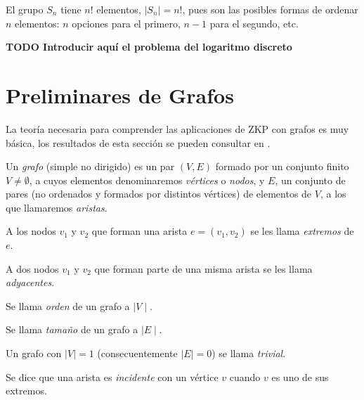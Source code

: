 \begin{remark}
	El grupo $S_n$ tiene $n!$ elementos, $\mid S_n \mid = n!$, pues son las posibles formas de ordenar $n$ elementos: $n$ opciones para el primero, $n-1$ para el segundo, etc.
\end{remark}




\textbf{TODO Introducir aquí el problema del logaritmo discreto}
%
%
%
%
%
%






\hfil

\section{Preliminares de Grafos}

La teoría necesaria para comprender las aplicaciones de ZKP con grafos es muy básica, los resultados de esta sección se pueden consultar en \citep{grafosyOD}.

\begin{definition}
	Un \textit{grafo} (simple no dirigido) es un par $(V,E)$ formado por un conjunto finito $V \neq \emptyset$, a cuyos elementos denominaremos \textit{vértices} o \textit{nodos}, y $E$, un conjunto de pares (no ordenados y formados por distintos vértices) de elementos de $V$, a los que llamaremos \textit{aristas}.
	
	A los nodos $v_1$ y $v_2$ que forman una arista $e = (v_1, v_2)$ se les llama \textit{extremos} de $e$.
\end{definition}


\begin{definition}[Conceptos]
	\hfil
	
	A dos nodos $v_1$ y $v_2$ que forman parte de una misma arista se les llama \textit{adyacentes}.
	
	Se llama \textit{orden} de un grafo a $\mid V \mid $.
	
	Se llama \textit{tamaño} de un grafo a $\mid E \mid $.
	
	Un grafo con $ \mid V \mid = 1$ (consecuentemente $\mid E \mid = 0$) se llama \textit{trivial}.
	
	Se dice que una arista es \textit{incidente} con un vértice $v$ cuando $v$ es uno de sus extremos.
\end{definition}



